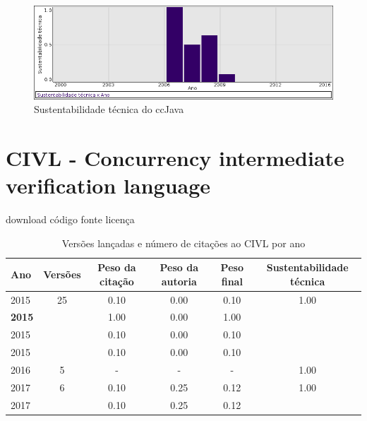\begin{figure}[h]
  \center
  \includegraphics[scale=0.50]{imagens/softwares-charts/ccjava.png}
  \caption{Sustentabilidade técnica do ccJava}
\end{figure}


\section{CIVL - Concurrency intermediate verification language}
\checkmark download
\checkmark código fonte
\checkmark licença


\begin{table}[H]
\caption{Versões lançadas e número de citações ao CIVL por ano}
\centering
\begin{tabular}{| l | c | c | c | c | c |}
  \hline
  Ano & Versões & Peso da citação & Peso da autoria & Peso final & Sustentabilidade técnica \\
  \hline
            2015
          &
          25
          &
          0.10
          &
          0.00
          &
          0.10
          &
            {\color{blue} 1.00}
          \\
            {\bf 2015}
          &
          
          &
          1.00
          &
          0.00
          &
          1.00
          &
          \\
            2015
          &
          
          &
          0.10
          &
          0.00
          &
          0.10
          &
          \\
            2015
          &
          
          &
          0.10
          &
          0.00
          &
          0.10
          &
          \\
\hline
        2016 & 5 & - & - & -
        &
          {\color{blue} 1.00}
        \\
\hline
            2017
          &
          6
          &
          0.10
          &
          0.25
          &
          0.12
          &
            {\color{blue} 1.00}
          \\
            2017
          &
          
          &
          0.10
          &
          0.25
          &
          0.12
          &
          \\
\hline
\end{tabular}
\end{table}

